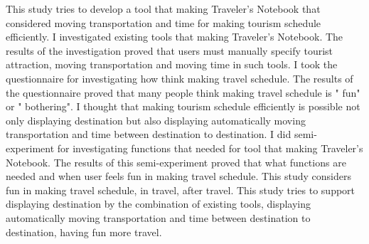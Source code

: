 \documentclass{funthesis}
\begin{document}
\maketitle       %

\begin{eabstract}
This study tries to develop a tool that making Traveler's Notebook that considered moving transportation and time for making tourism schedule efficiently.
I investigated existing tools that making Traveler's Notebook. The results of the investigation proved that users must manually specify tourist attraction, moving transportation and moving time in such tools.
I took the questionnaire for investigating how think making travel schedule. The results of the questionnaire proved that many people think making travel schedule is " fun" or " bothering".
I thought that making tourism schedule efficiently is possible not only displaying destination but also displaying automatically moving transportation and time between destination to destination.
I did semi-experiment for investigating functions that needed for tool that making Traveler's Notebook. The results of this semi-experiment proved that what functions are needed and when user feels fun in making travel schedule. This study considers fun in making travel schedule, in travel, after travel.
This study tries to support displaying destination by the combination of existing tools, displaying automatically moving transportation and time between destination to destination, having fun more travel.



\end{eabstract}
\end{document}
